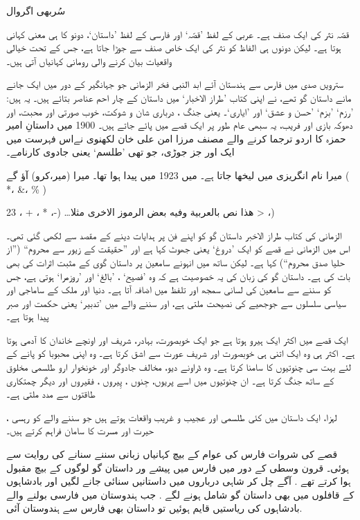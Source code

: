 \documentclass[a4paper]{article}
\begin{document}
\RTL
\begin{center}
\fontsize{36pt}{12pt}\amiri
سُربھی اگروال
\end{center}
\setlength{\parindent}{0pt}
\setlength{\parskip}{24pt plus 10pt}
\fontsize{12pt}{12pt}\linespread{2.5}\notourdu
قصّہ نثر کی ایک صنف ہے۔ عربی کے لفظ ’قصّہ‘ اور فارسی کے  لفظ  ’داستان‘، دونو کا ہی معنی  کہانی ہوتا ہے۔ لیکن دونوں ہی الفاظ کو نثر کی ایک خاص صنف سے جوڑا جاتا ہے، جس کے تحت خیالی واقعیات بیان کرنے والی رومانی کہانیاں آتی ہیں۔  

سترویں صدی میں فارس سے ہندستان آئے ابد النبی فخر الزمانی جو جہانگیر کے دور میں ایک جانے مانے داستان گو تھے، نے اپنی کتاب ’طراز الاخبار‘ میں داستان کے چار احم عناصر بتائے ہیں۔ یہ ہیں: ’رزم‘ ’بزم‘ ’حسن و عشق‘ اور ’ایاری‘۔ یعنی جنگ ، درباری شان و شوکت، خوب صورتی اور محبت، اور  دھوکہ بازی اور فریب، یہ سبھی عام طور پر ایک قصے میں پائے جاتے ہیں۔ 1900 میں داستانِ امیر حمزہ کا اردو ترجما کرنے والے مصنف مرزا امن علی خان لکھنوی نےاس فہرست میں ایک اور جز جوڑی، جو تھی ’طلسم‘  یعنی جادوی کارنامے۔

میرا نام انگریزی میں
 لیخھا جاتا ہے۔ میں 
1923 میں پیدا ہوا تھا۔
میرا (میر،کرو)    آؤ گے
( *، \&، \% )


هذا نص بالعربية وفيه بعض الرموز الاخرى مثلا… (-، * ، + ، 23 ‪>‬ ،)

الزمانی کی کتاب طراز الاخبر داستان گو کو اپنے فن پر ہدایات دینے کے مقصد سے لکھی گئی تھی۔ اس میں الزمانی نے قصے کو ایک ’دروغ‘ یعنی جھوٹ کہا ہے اور ”حقیقت کے زیور سے محروم“ (”از حلیا صدق محروم“) کہا ہے۔  لیکن ساتھ میں انہونے سامعین پر داستان گوی  کے مثبت اثرات کی بھی بات کی ہے۔  داستان گو کی زبان کی یہ خصوصیت ہے کہ وہ ’فصیح‘ ، ’بالغ‘ اور ’روزمرا‘ ہوتی ہے، جس کو سننے سے سامعین کی لسانی سمجھ اور تلفظ میں اضافہ آتا ہے۔ دنیا اور ملک کے ساماجی اور سیاسی سلسلوں  سے جوجھیے کی نصیحت ملتی ہے، اور سننے والے میں ’تدبیر‘ یعنی حکمت اور صبر پیدا ہوتا ہے۔

ایک قصے میں اکثر ایک ہیرو ہوتا ہے جو ایک خوبصورت، بہادر، شریف اور اونچے خاندان کا آدمی ہوتا ہے۔ اکثر ہی وہ ایک اتنی ہی خوبصورت اور شریف  عورت سے اشق کرتا ہے۔ وہ اپنی محبوبا کو پانے کے لئے بہت سی چنوتیوں کا سامنا کرتا ہے۔ وہ ڈراونے دیو، مخالف جادوگر اور خونخوار ارو طلسمی مخلوق کے ساتھ جنگ کرتا ہے۔ ان چنوتیوں میں اسے پریوں، جِنوں ، پِیروں ، فقیروں اور دیگر چمتکاری طاقتوں  سے مدد ملتی ہے۔

لہزا، ایک داستان میں کئی طلسمی اور عجیب و غریب واقعات ہوتے ہیں جو سننے والے کو رہسی ، حیرت اور مسرت کا سامان فراہم کرتے ہیں۔

قصے کی شروات فارس کی عوام کے بیچ کہانیاں زبانی سننے سنانے کی روایت سے ہوئی۔ قرون وسطی کے دور میں فارس میں پیشے ور داستان گو لوگوں کے بیچ مقبول ہوا کرتے تھے . آگے چل کر شاہی درباروں میں داستانیں سنائی جانے لگیں اور بادشاہوں کے قافلوں میں بھی داستان گو شامل ہونے لگے . جب ہندوستان میں فارسی بولنے والے بادشاہوں کی ریاستیں قایم ہوئیں تو داستان بھی فارس سے ہندوستان آئی.
\end{document}
